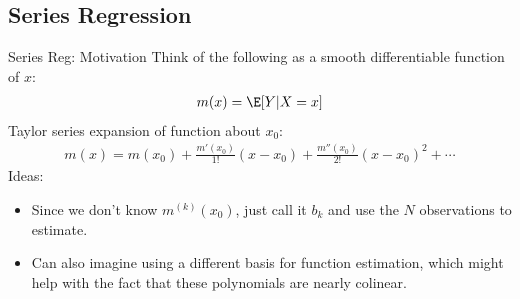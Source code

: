 \documentclass[aspectratio=169, handout]{beamer}
\begin{document}



\subsection{Series Regression}


{\footnotesize
\begin{frame}{Series Reg: Motivation}
Think of the following as a smooth differentiable function of $x$:
\begin{align*}
  m(x)
  =
  \E[Y|X=x]
\end{align*}
\pause
\alert{Taylor series expansion} of function about $x_0$:
\begin{align*}
  m(x)
  =
  m(x_0)
  +
  \frac{m'(x_0)}{1!}
  (x-x_0)
  +
  \frac{m''(x_0)}{2!}
  (x-x_0)^2
  +
  \cdots
\end{align*}
\pause
Ideas:
\begin{itemize}
  \item Since we don't know $m^{(k)}(x_0)$, just call it $b_k$ and use
    the $N$ observations to \alert{estimate}.


  \pause
  \item Can also imagine using a different \alert{basis} for function
    estimation, which might help with the fact that these polynomials
    are nearly colinear.
\end{itemize}
\end{frame}
}
\end{document}
